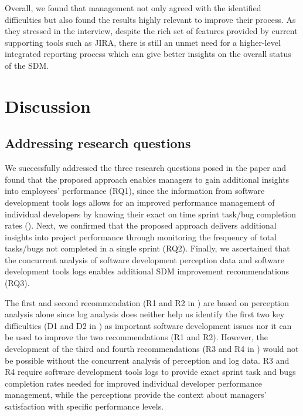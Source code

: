 Overall, we found that management not only agreed with the identified difficulties but also found the results highly relevant to improve their process. As they stressed in the interview, despite the rich set of features provided by current supporting tools such as JIRA, there is still an unmet need for a higher-level integrated reporting process which can give better insights on the overall status of the SDM. 


\section{Discussion}

\subsection{Addressing research questions}

We successfully addressed the three research questions posed in the paper and found that the proposed approach enables managers to gain additional insights into employees’ performance (RQ1), since the information from software development tools logs allows for an improved performance management of individual developers by knowing their exact on time sprint task/bug completion rates (). Next, we confirmed that the proposed approach delivers additional insights into project performance through monitoring the frequency of total tasks/bugs not completed in a single sprint (RQ2). Finally, we ascertained that the concurrent analysis of software development perception data and software development tools logs enables additional SDM improvement recommendations (RQ3). 

The first and second recommendation (R1 and R2 in ) are based on perception analysis alone since log analysis does neither help us identify the first two key difficulties (D1 and D2 in ) as important software development issues nor it can be used to improve the two recommendations (R1 and R2). However, the development of the third and fourth recommendations (R3 and R4 in ) would not be possible without the concurrent analysis of perception and log data.  R3 and R4 require software development tools logs to provide exact sprint task and bugs completion rates needed for improved individual developer performance management, while the perceptions provide the context about managers’ satisfaction with specific performance levels.

